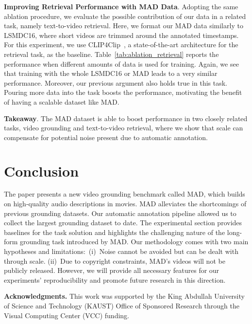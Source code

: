 \documentclass[10pt,twocolumn,letterpaper]{article}
\renewcommand{\paragraph}[1]{\vspace{1mm}\noindent\textbf{#1}.}
\begin{document}
\paragraph{Improving Retrieval Performance with MAD Data}
Adopting the same ablation procedure, we evaluate the possible contribution of our data in a related task, namely text-to-video retrieval. Here, we format our MAD data similarly to LSMDC16, where short videos are trimmed around the annotated timestamps. For this experiment, we use CLIP4Clip~\cite{luo2021clip4clip}, a state-of-the-art architecture for the retrieval task, as the baseline. Table~\ref{tab:ablation_retrieval} reports the performance when different amounts of data is used for training. Again, we see that training with the whole LSMDC16 or MAD leads to a very similar performance. Moreover, our previous argument also holds true in this task. Pouring more data into the task boosts the performance, motivating the benefit of having a scalable dataset like MAD.  

\paragraph{Takeaway}
The MAD dataset is able to boost performance in two closely related tasks, video grounding and text-to-video retrieval, where we show that scale can compensate for potential noise present due to automatic annotation.  

 \section{Conclusion}\label{sec: conclusions}
The paper presents a new video grounding benchmark called MAD, which builds on high-quality audio descriptions in movies. MAD alleviates the shortcomings of previous grounding datasets. Our automatic annotation pipeline allowed us to collect the largest grounding dataset to date. The experimental section provides baselines for the task solution and highlights the challenging nature of the long-form grounding task introduced by MAD. Our methodology comes with two main hypotheses and limitations:~(i)~Noise cannot be avoided but can be dealt with through scale. (ii)~Due to copyright constraints, MAD's videos will not be publicly released. However, we will provide all necessary features for our experiments' reproducibility and promote future research in this direction.

\noindent\textbf{Acknowledgments.} This work was supported by the King Abdullah University of Science and Technology (KAUST) Office of Sponsored Research through the Visual Computing Center (VCC) funding. 
{\small


}
\end{document}
